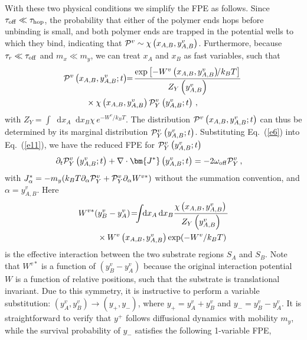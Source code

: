 \documentclass[twocolumn,prl,english]{revtex4-1}
\newcommand*\diff{\mathop{}\!\mathrm{d}}
\begin{document}
  With these two physical conditions we simplify the FPE as follows. Since $\tau_{\rm off} \ll \tau_{\rm hop}$, the probability that either of the polymer ends hops before unbinding is small, and both polymer ends are trapped in the potential wells to which they bind,  indicating that ${\cal P}^v\sim \chi\left(x_{A,B}, y_{A,B}^v\right)$. Furthermore, because $\tau_r \ll \tau_{\rm off}$  and $m_x \ll m_y$, we can treat $x_A$ and $x_B$ as fast variables, such that
\begin{align}
\!{\cal P}^v\left(x_{A,B}, y_{A,B}^v;t\right)&\!\!=\!\frac{\exp{\left[- W^v\left(x_{A,B}, y_{A,B}^v\right)\!\!/k_B T\right]}}{Z_Y\left(y_{A,B}^v\right)}\notag\\&\!\!\!\!\!\!\!\!\!\!\!\!\!\!\!\!\!\!\!\!\!\!\!\!\!\!\!\!\!\!\times\chi\left(x_{A,B}, y_{A,B}^v\right){\cal P}^v_Y\left(y_{A,B}^v;t\right)\,,\label{e6}
\end{align}
with $Z_Y=\int \diff x_A \diff  x_B \chi \, {e^{- W^v/k_BT}}$. The distribution ${\cal P}^v\left(x_{A,B}, y_{A,B}^v;t\right)$ can thus be determined by its marginal distribution ${\cal P}^v_Y\left(y_{A,B}^v;t\right)$. Substituting Eq.~(\ref{e6}) into Eq.~(\ref{e11}), we have the reduced FPE for ${\cal P}^v_Y\left(y_{A,B}^v;t\right)$
\begin{align}
&\partial_t {\cal P}^v_Y\left(y_{A,B}^v;t\right)+\nabla \cdot {\bm {J^{*}}\left(y_{A,B}^v;t\right)}= - 2\omega_{\rm off}{\cal P}^v_Y\,,\label{e7}
\end{align}
with $J^*_\alpha=-m_y( k_B T\partial_\alpha {\cal P}^v_Y+{\cal P}^v_Y  \partial_\alpha W^{v*})$ without the summation convention,  and $\alpha = y^v_{A,B}$. Here
\begin{align}
W^{v*}(y_B^v-y_A^v)&\!=\!\!\!\int \!\!\diff x_A \diff x_B \frac{\chi\left(x_{A,B}, y_{A,B}^v\right) \, }{Z_Y\left(y_{A,B}^v\right)}\notag\\&\!\!\!\!\!\!\!\!\!\!\!\!\!\!\!\!\!\!\!\!\!\!\!\!\times W^v\left(x_{A,B}, y_{A,B}^v\right)\exp({- W^v/k_BT})\,\label{e8}
\end{align}
is the effective interaction between the two substrate regions $S_A$ and $S_B$. Note that $W^{v*}$ is a function of $(y_B^v-y_A^v)$ because the original interaction potential $W$ is a function of relative positions, such that the substrate is translational invariant. Due to this symmetry, it is instructive to perform a variable substitution:  $(y_A^v, y_B^v)\to(y_+,y_-)$, where $y_+ = y_A^v + y_B^v$ and $ y_- = y_B^v-y_A^v$. It is straightforward to verify that $y^+$ follows diffusional dynamics with mobility $m_y$, while the survival probability of $ y_-$ satisfies the following 1-variable FPE, 
\end{document}
